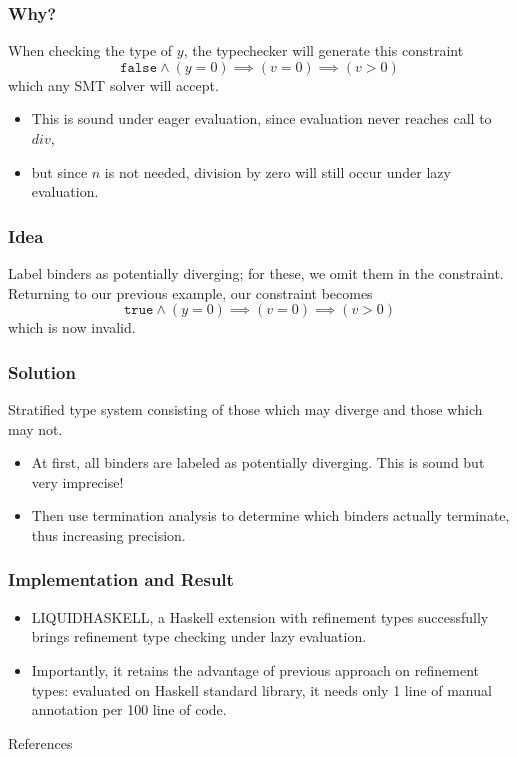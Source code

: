 \documentclass[pdf]{beamer}
\begin{document}
\begin{frame}
  \frametitle{Why?}
  When checking the type of $y$, the typechecker will generate this constraint
  $$\mathtt{false}\wedge(y=0)\implies(v=0)\implies(v>0)$$
  which any SMT solver will accept.
  \begin{itemize}
    \item This is sound under eager evaluation, since evaluation never reaches call to $div$,
    \item but since $n$ is not needed, division by zero will still occur under lazy evaluation.
  \end{itemize}
\end{frame}

\begin{frame}
  \frametitle{Idea}
  Label binders as potentially diverging; for these, we omit them in the
  constraint.  Returning to our previous example, our constraint becomes
  $$\mathtt{true}\wedge(y=0)\implies(v=0)\implies(v>0)$$
  which is now invalid.
\end{frame}

\begin{frame}
  \frametitle{Solution}
  Stratified type system consisting of those which may diverge and those which
  may not.
  \begin{itemize}
    \item At first, all binders are labeled as potentially diverging.  This is
      sound but very imprecise!
    \item Then use termination analysis to determine which binders actually
      terminate, thus increasing precision.
  \end{itemize}
\end{frame}


\begin{frame}
  \frametitle{Implementation and Result}
  \begin{itemize}
    \item LIQUIDHASKELL, a Haskell extension with refinement types successfully
      brings refinement type checking under lazy evaluation.  
    \item Importantly, it retains the advantage of previous approach on
      refinement types: evaluated on Haskell standard library, it needs only 1
      line of manual annotation per 100 line of code.
  \end{itemize}
\end{frame}

\begin{frame}{References}
  
  
  \nocite{Rondon:2008:LT,Xi:1998:EAB,DBLP:conf/focs/HopcroftPV75}
\end{frame}
\end{document}
